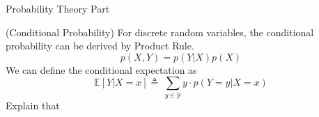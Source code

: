 \documentclass[a4paper, 12pt, answers]{exam} %
\begin{document}
\begin{questions}
	
Probability Theory Part

	\question (Conditional Probability) For discrete random variables, the conditional probability can be derived by Product Rule.
	\begin{equation*}
	p\left(X,Y\right)=p\left(Y|X\right)p\left(X\right)
	\end{equation*}
	We can define the conditional expectation as 
	\begin{equation*}
	\mathbb{E}\left[Y|X=x\right] \triangleq\ \sum_{y\in \mathcal{Y}}y \cdot p\left(Y=y|X=x\right)
	\end{equation*}
	Explain that
    \begin{solution}
\end{solution}
\end{questions}
\end{document}
